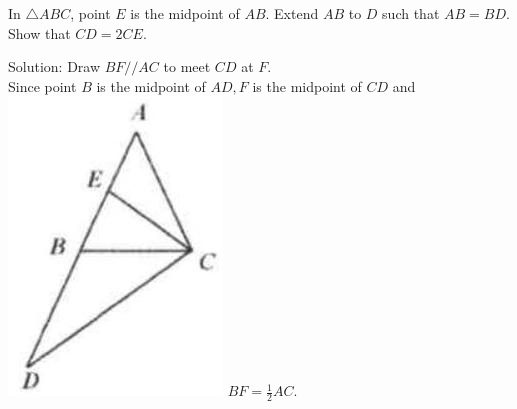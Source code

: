 \documentclass{article}
\begin{document}
In \(\triangle A B C\), point \(E\) is the midpoint of \(A B\). Extend \(A B\) to \(D\) such that \(A B=B D\). Show that \(C D=2 C E\).

Solution:
Draw \(B F / / A C\) to meet \(C D\) at \(F\).\\
Since point \(B\) is the midpoint of \(A D, F\) is the midpoint of \(C D\) and\\
\includegraphics[width=\textwidth]{images/118(1).jpg} \(B F=\frac{1}{2} A C\).
\end{document}
